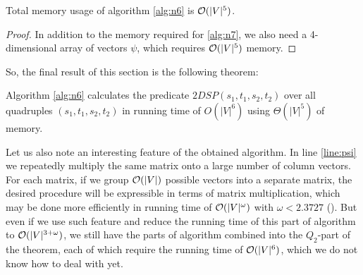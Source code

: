 \begin{proposition}
Total memory usage of algorithm \ref{alg:n6} is $\mathcal{O}(|V|^5)$.
\end{proposition}
\begin{proof}
In addition to the memory required for \ref{alg:n7}, we also need a 4-dimensional array of vectors $\psi$, which requires $\mathcal{O}(|V|^5)$ memory.
\end{proof}

So, the final result of this section is the following theorem:
\begin{theorem}
Algorithm \ref{alg:n6} calculates the predicate $2DSP(s_1, t_1, s_2, t_2)$ over all quadruples $(s_1, t_1, s_2, t_2)$ in running time of $O(|V|^6)$ using $\Theta(|V|^5)$ of memory. 
\end{theorem}

Let us also note an interesting feature of the obtained algorithm. In line \ref{line:psi} we repeatedly multiply the same matrix onto a large number of column vectors. For each matrix, if we group $\mathcal{O}(|V|)$ possible vectors into a separate matrix, the desired procedure will be expressible in terms of matrix multiplication, which may be done more efficiently in running time of $\mathcal{O}(|V|^\omega)$ with $\omega < 2.3727$ (\cite{Williams}). But even if we use such feature and reduce the running time of this part of algorithm to $\mathcal{O}(|V|^{{3 + \omega}})$, we still have the parts of algorithm combined into the $Q_2$-part of the theorem, each of which require the running time of $\mathcal{O}(|V|^6)$, which we do not know how to deal with yet.
